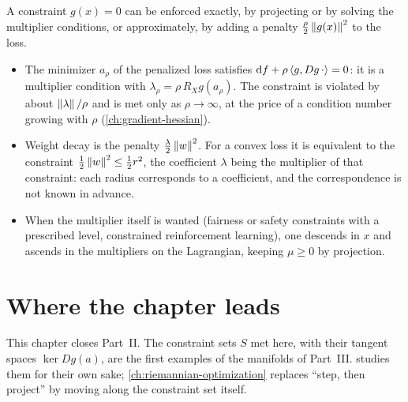 \begin{notechapter}
\begin{mlthread}
A constraint $g(x) = 0$ can be enforced exactly, by projecting or by
solving the multiplier conditions, or approximately, by adding a penalty
$\frac\rho2\left\|g(x)\right\|^2$ to the loss.
\begin{itemize}[nosep]
  \item The minimizer $a_\rho$ of the penalized loss satisfies
        $\mathrm{d} f + \rho\left\langle g, Dg\,\cdot \right\rangle = 0$: it is a multiplier
        condition with $\lambda_\rho = \rho\,R_X g(a_\rho)$. The
        constraint is violated by about $\left\|\lambda\right\|/\rho$ and is met
        only as $\rho\to\infty$, at the price of a condition number
        growing with $\rho$ (\cref{ch:gradient-hessian}).
  \item Weight decay is the penalty $\frac\lambda2\left\|w\right\|^2$. For a
        convex loss it is equivalent to the constraint
        $\frac12\left\|w\right\|^2\leq\frac12r^2$, the coefficient $\lambda$ being
        the multiplier of that constraint: each radius corresponds to a
        coefficient, and the correspondence is not known in advance.
  \item When the multiplier itself is wanted (fairness or safety
        constraints with a prescribed level, constrained reinforcement
        learning), one descends in $x$ and ascends in the multipliers on
        the Lagrangian, keeping $\mu\geq0$ by projection.
\end{itemize}
\end{mlthread}

\section{Where the chapter leads}
\label{constrained-optimization:sec:outlook}

This chapter closes Part~II. The constraint sets $S$ met here, with their
tangent spaces $\ker Dg(a)$, are the first examples of the manifolds of
Part~III.  studies them for their own sake;
\cref{ch:riemannian-optimization} replaces ``step, then project'' by
moving along the constraint set itself.


\end{notechapter}
